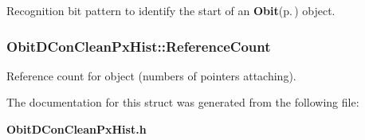 Recognition bit pattern to identify the start of an {\bf Obit}{\rm (p.\,\pageref{structObit})} object. 

\subsubsection{ {\bf Obit\-DCon\-Clean\-Px\-Hist::Reference\-Count}}\label{structObitDConCleanPxHist_o2}


Reference count for object (numbers of pointers attaching). 



The documentation for this struct was generated from the following file:\begin{CompactItemize}
\item 
{\bf Obit\-DCon\-Clean\-Px\-Hist.h}\end{CompactItemize}
